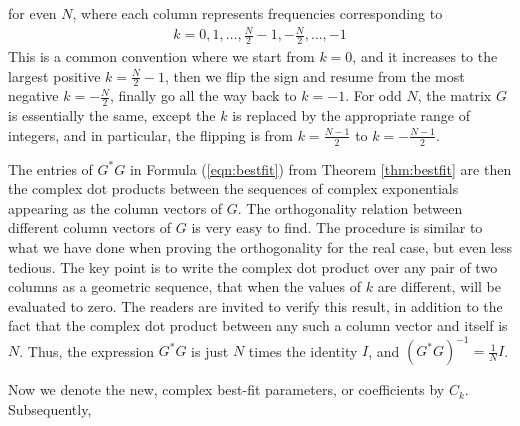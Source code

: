 for even $N$, where each column represents frequencies corresponding to 
\begin{align*}
k = 0, 1, \ldots, \frac{N}{2}-1, -\frac{N}{2}, \ldots, -1    
\end{align*}
This is a common convention where we start from $k = 0$, and it increases to the largest positive $k = \frac{N}{2}-1$, then we flip the sign and resume from the most negative $k = -\frac{N}{2}$, finally go all the way back to $k = -1$. For odd $N$, the matrix $G$ is essentially the same, except the $k$ is replaced by the appropriate range of integers, and in particular, the flipping is from $k = \frac{N-1}{2}$ to $k = -\frac{N-1}{2}$. \par
The entries of $G^*G$ in Formula (\ref{eqn:bestfit}) from Theorem \ref{thm:bestfit} are then the complex dot products between the sequences of complex exponentials appearing as the column vectors of $G$. The orthogonality relation between different column vectors of $G$ is very easy to find. The procedure is similar to what we have done when proving the orthogonality for the real case, but even less tedious. The key point is to write the complex dot product over any pair of two columns as a geometric sequence, that when the values of $k$ are different, will be evaluated to zero. The readers are invited to verify this result, in addition to the fact that the complex dot product between any such a column vector and itself is $N$.\footnotemark{} Thus, the expression $G^*G$ is just $N$ times the identity $I$, and $(G^*G)^{-1} = \frac{1}{N} I$. \par
Now we denote the new, complex best-fit parameters, or coefficients by $C_k$. Subsequently,
